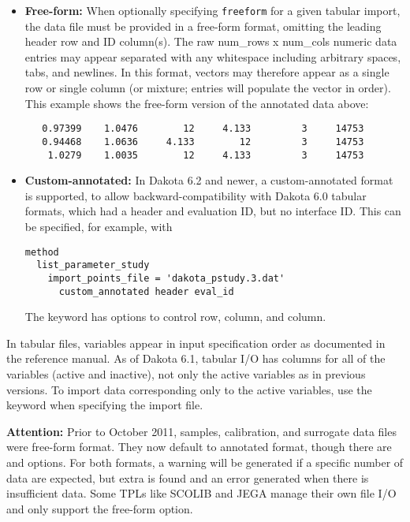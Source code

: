 \begin{itemize}
\item \textbf{Free-form:} When optionally specifying \texttt{freeform}
  for a given tabular import, the data file must be provided in a
  free-form format, omitting the leading header row and ID
  column(s). The raw num\_rows x num\_cols numeric data entries may
  appear separated with any whitespace including arbitrary spaces,
  tabs, and newlines.  In this format, vectors may therefore appear as
  a single row or single column (or mixture; entries will populate the
  vector in order).  This example shows the free-form version of the
  annotated data above:
\begin{verbatim}
   0.97399    1.0476        12     4.133         3     14753 
   0.94468    1.0636     4.133        12         3     14753 
    1.0279    1.0035        12     4.133         3     14753 
\end{verbatim}

\item \textbf{Custom-annotated:} In Dakota 6.2 and newer, a
  custom-annotated format is supported, to allow
  backward-compatibility with Dakota 6.0 tabular formats, which had a
  header and evaluation ID, but no interface ID.  This can be
  specified, for example, with
\begin{verbatim}
method
  list_parameter_study
    import_points_file = 'dakota_pstudy.3.dat'
      custom_annotated header eval_id
\end{verbatim}
  The  keyword has options to control
   row,  column, and
   column.

\end{itemize}

In tabular files, variables appear in input specification order as
documented in the reference manual.  As of Dakota 6.1, tabular I/O has
columns for all of the variables (active and inactive), not only the
active variables as in previous versions.  To import data
corresponding only to the active variables, use the keyword
 when specifying the import file.

{\bf Attention:} Prior to October 2011, samples, calibration, and
surrogate data files were free-form format.  They now default to
annotated format, though there are  and
 options.  For both formats, a warning will
be generated if a specific number of data are expected, but extra is
found and an error generated when there is insufficient data.  Some
TPLs like SCOLIB and JEGA manage their own file I/O and only support
the free-form option.


